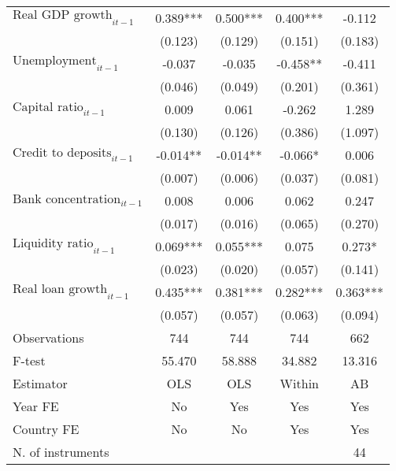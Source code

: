 \begin{longtable}{m{8cm}*{4}{c}}
$\text{Real GDP growth}_{it-1}$&       0.389***&       0.500***&       0.400***&      -0.112   \\
                    &     (0.123)   &     (0.129)   &     (0.151)   &     (0.183)   \\
$\text{Unemployment}_{it-1}$&      -0.037   &      -0.035   &      -0.458** &      -0.411   \\
                    &     (0.046)   &     (0.049)   &     (0.201)   &     (0.361)   \\
$\text{Capital ratio}_{it-1}$&       0.009   &       0.061   &      -0.262   &       1.289   \\
                    &     (0.130)   &     (0.126)   &     (0.386)   &     (1.097)   \\
$\text{Credit to deposits}_{it-1}$&      -0.014** &      -0.014** &      -0.066*  &       0.006   \\
                    &     (0.007)   &     (0.006)   &     (0.037)   &     (0.081)   \\
$\text{Bank concentration}_{it-1}$&       0.008   &       0.006   &       0.062   &       0.247   \\
                    &     (0.017)   &     (0.016)   &     (0.065)   &     (0.270)   \\
$\text{Liquidity ratio}_{it-1}$&       0.069***&       0.055***&       0.075   &       0.273*  \\
                    &     (0.023)   &     (0.020)   &     (0.057)   &     (0.141)   \\
$\text{Real loan growth}_{it-1}$&       0.435***&       0.381***&       0.282***&       0.363***\\
                    &     (0.057)   &     (0.057)   &     (0.063)   &     (0.094)   \\
\midrule
Observations        &         744   &         744   &         744   &         662   \\
F-test              &      55.470   &      58.888   &      34.882   &      13.316   \\
Estimator           &         OLS   &         OLS   &      Within   &          AB   \\
Year FE             &          No   &         Yes   &         Yes   &         Yes   \\
Country FE          &          No   &          No   &         Yes   &         Yes   \\
N. of instruments   &               &               &               &          44   \\

\end{longtable}
